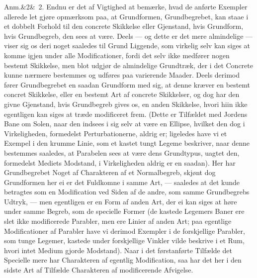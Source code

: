 \documentclass[12pt]{book}
\def\sperr#1{#1}%
\def\textit#1{#1}%
\def\emph#1{#1}%
\newcommand{\sperr}[1]{\textls[180]{#1}}
\newcommand{\anm}[1]{%
  \par\vspace{0.5\baselineskip}%
  \noindent\hspace{\parindent}\sperr{Anm.}\ifx&#1&\else~\textit{#1}.\fi
  \enspace\ignorespaces
}
\newcommand{\opage}[1]{\marginnote{\footnotesize\textit{[#1]}}}
\begin{document}
\anm{2} Endnu er det af Vigtighed at bemærke, hvad de anførte Exempler allerede let gjøre
opmærksom paa, at Grundformen, Grundbegrebet, kan staae i et dobbelt Forhold til den
concrete Skikkelse eller Gjenstand, hvis Grundform, hvis Grundbegreb, den sees at være.
\emph{Deels} --- og dette er det mere almindelige --- viser sig os deri noget saaledes
til Grund Liggende, som virkelig selv kan siges at komme igjen under alle Modificationer,
fordi det selv ikke medfører nogen bestemt Skikkelse, men blot udgjør de almindelige
Grundtræk, der i det Concrete kunne nærmere bestemmes og udføres paa varierende Maader.
\emph{Deels} derimod fører Grundbegrebet en saadan Grundform med sig, at denne kræver en
bestemt concret Skikkelse, eller en bestemt Art af concrete Skikkelser, og dog
\opage{127} har den givne Gjenstand, hvis Grundbegreb gives os, en anden Skikkelse, hvori hiin ikke
egentligen kan siges at træde modificeret frem. (Dette er Tilfældet med Jordens Bane om
Solen, naar den indsees i sig selv at være en Ellipse, hvilket den dog i Virkeligheden,
formedelst Perturbationerne, aldrig er; ligeledes have vi et Exempel i den krumme Linie,
som et kastet tungt Legeme beskriver, naar denne bestemmes saaledes, at Parabelen sees at
være dens Grundtypus, uagtet den, formedelst Mediets Modstand, i Virkeligheden aldrig er
en saadan). Her har Grundbegrebet Noget af Charakteren af et Normalbegreb, skjønt dog
Grundformen her ei er det Fuldkomne i samme Art, --- saaledes at det kunde betragtes som
en Modification ved Siden af de andre, som samme Grundbegrebs Udtryk, --- men egentligen
er en Form af anden Art, der ei kan siges at høre under samme Begreb, som de specielle
Former (de kastede Legemers Baner ere slet ikke modificerede Parabler, men ere Linier af
anden Art; paa egentlige Modificationer af Parabler have vi derimod Exempler i de
forskjellige Parabler, som tunge Legemer, kastede under forskjellige Vinkler vilde
beskrive i et Rum, hvori intet Medium gjorde Modstand). Naar i det førstanførte Tilfælde
det Specielle mere har Charakteren af egentlig Modification, saa har det her i den sidste
Art af Tilfælde Charakteren af modificerende Afvigelse.
\end{document}
